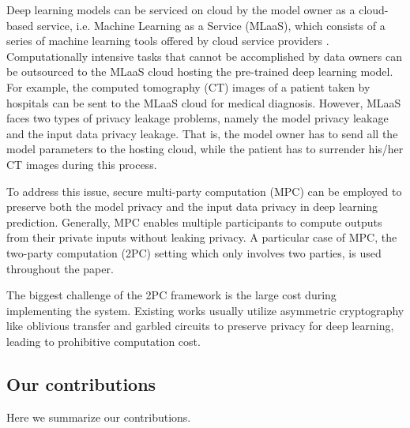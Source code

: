 \documentclass[letterpaper]{article} %
\begin{document}
    Deep learning models can be serviced on cloud by the model owner as a cloud-based service,
    i.e. Machine Learning as a Service (MLaaS),
    which consists of a series of machine learning tools offered by cloud service providers \cite{ChironCloud}.
    Computationally intensive tasks that cannot be accomplished by data owners can be outsourced to
    the MLaaS cloud hosting the pre-trained deep learning model.
    For example, the computed tomography (CT) images of a patient taken by hospitals
    can be sent to the MLaaS cloud for medical diagnosis.
    However, MLaaS faces two types of privacy leakage problems, namely the model privacy leakage and the
    input data privacy leakage. That is, the model owner has to send all the model parameters to the hosting cloud,
    while the patient has to surrender his/her CT images during this process.

    To address this issue, secure multi-party computation (MPC) can be employed to preserve both the model privacy
    and the input data privacy in deep learning prediction.
    Generally, MPC enables multiple participants
    to compute outputs from their private inputs without leaking privacy.
    A particular case of MPC, the two-party computation (2PC) setting
    which only involves two parties, is used throughout the paper.

    The biggest challenge of the 2PC framework
    is the large cost during implementing the system.
    Existing works usually utilize asymmetric cryptography like oblivious transfer and garbled circuits
    to preserve privacy for deep learning,
    leading to prohibitive computation cost.


    \subsection{Our contributions}%
    Here we summarize our contributions.
\end{document}
